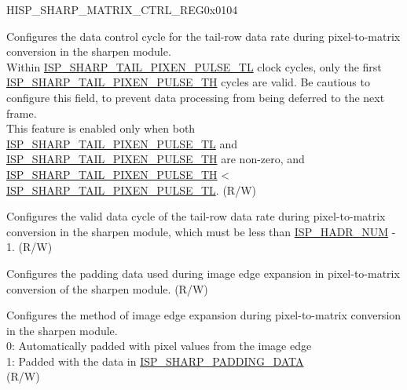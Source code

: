 \begin{register}{H}{ISP\_SHARP\_MATRIX\_CTRL\_REG}{0x0104}\label{regdesc:ISPSHARPMATRIXCTRLREG}
%
%
%
%
%
\regnewline%
\begin{regdesc}\begin{reglist}
\label{fielddesc:ISPSHARPTAILPIXENPULSETL}\item [ISP\_SHARP\_TAIL\_PIXEN\_PULSE\_TL] Configures the data control cycle for the tail-row data rate during pixel-to-matrix conversion in the sharpen module.\\Within \hyperref[fielddesc:ISPSHARPTAILPIXENPULSETL]{ISP\_SHARP\_TAIL\_PIXEN\_PULSE\_TL} clock cycles, only the first \hyperref[fielddesc:ISPSHARPTAILPIXENPULSETH]{ISP\_SHARP\_TAIL\_PIXEN\_PULSE\_TH} cycles are valid. Be cautious to configure this field, to prevent data processing from being deferred to the next frame.\\This feature is enabled only when both \hyperref[fielddesc:ISPSHARPTAILPIXENPULSETL]{ISP\_SHARP\_TAIL\_PIXEN\_PULSE\_TL} and \hyperref[fielddesc:ISPSHARPTAILPIXENPULSETH]{ISP\_SHARP\_TAIL\_PIXEN\_PULSE\_TH} are non-zero, and \hyperref[fielddesc:ISPSHARPTAILPIXENPULSETH]{ISP\_SHARP\_TAIL\_PIXEN\_PULSE\_TH} < \hyperref[fielddesc:ISPSHARPTAILPIXENPULSETL]{ISP\_SHARP\_TAIL\_PIXEN\_PULSE\_TL}. (R/W)
\label{fielddesc:ISPSHARPTAILPIXENPULSETH}\item [ISP\_SHARP\_TAIL\_PIXEN\_PULSE\_TH] Configures the valid data cycle of the tail-row data rate during pixel-to-matrix conversion in the sharpen module, which must be less than \hyperref[fielddesc:ISPHADRNUM]{ISP\_HADR\_NUM} - 1. (R/W)
\label{fielddesc:ISPSHARPPADDINGDATA}\item [ISP\_SHARP\_PADDING\_DATA] Configures the padding data used during image edge expansion in pixel-to-matrix conversion of the sharpen module. (R/W)
\label{fielddesc:ISPSHARPPADDINGMODE}\item [ISP\_SHARP\_PADDING\_MODE] Configures the method of image edge expansion during pixel-to-matrix conversion in the sharpen module.\\0: Automatically padded with pixel values from the image edge\\1: Padded with the data in \hyperref[fielddesc:ISPSHARPPADDINGDATA]{ISP\_SHARP\_PADDING\_DATA}\\(R/W)
\end{reglist}\end{regdesc}
\end{register}



